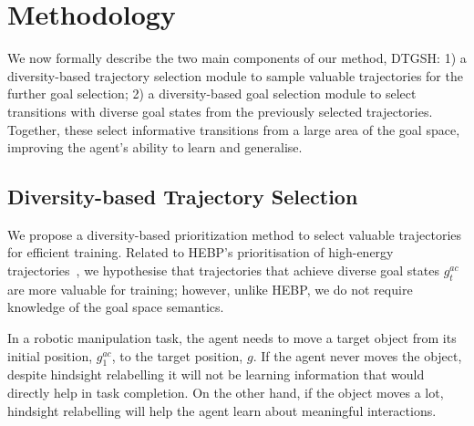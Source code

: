 \section{Methodology}
We now formally describe the two main components of our method, DTGSH: 1) a diversity-based trajectory selection module to sample valuable trajectories for the further goal selection; 2) a diversity-based goal selection module to select transitions with diverse goal states from the previously selected trajectories. Together, these select informative transitions from a large area of the goal space, improving the agent's ability to learn and generalise.

\subsection{Diversity-based Trajectory Selection}
We propose a diversity-based prioritization method to select valuable trajectories for efficient training. Related to HEBP's prioritisation of high-energy trajectories~\cite{zhao2018energy}, we hypothesise that trajectories that achieve diverse goal states $g^{ac}_{t}$ are more valuable for training; however, unlike HEBP, we do not require knowledge of the goal space semantics.

In a robotic manipulation task, the agent needs to move a target object from its initial position, $g^{ac}_{1}$, to the target position, $g$. If the agent never moves the object, despite hindsight relabelling it will not be learning information that would directly help in task completion. On the other hand, if the object moves a lot, hindsight relabelling will help the agent learn about meaningful interactions.

